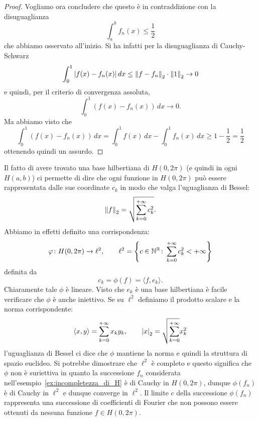 \begin{proof}
Vogliamo ora concludere che questo è in contraddizione con la disuguaglianza
\[
  \int_a^b f_n(x) \le \frac 1 2
\]
che abbiamo osservato all'inizio.
Si ha infatti per la disuguaglianza di Cauchy-Schwarz
\begin{align*}
  \int_0^1 {\left|f(x)-f_n(x)\right|}\, dx
  \le {\left\Vert f-f_n\right\Vert}_2\cdot {\left\Vert 1\right\Vert}_2  \to 0
\end{align*}
e quindi, per il criterio di convergenza assoluta,
\[
  \int_0^1 (f(x) - f_n(x))\, dx \to 0.
\]
Ma abbiamo visto che
\[
  \int_0^1 (f(x) - f_n(x))\, dx
  = \int_0^1 f(x)\, dx - \int_0^1 f_n(x)\, dx
  \ge 1 - \frac 1 2 = \frac 1 2
\]
ottenendo quindi un assurdo.
\end{proof}

Il fatto di avere trovato una base hilbertiana di $H(0,2\pi)$ (e quindi
in ogni $H(a,b)$) ci permette di
dire che ogni funzione in $H(0,2\pi)$ può essere rappresentata dalle sue
coordinate $c_k$ in modo che valga l'uguaglianza di Bessel:
\[
  {\left\Vert f\right\Vert}_2 = \sqrt{\sum_{k=0}^{+\infty} c_k^2}.
\]
Abbiamo in effetti definito una corrispondenza:
\[
  \varphi \colon H(0,2\pi) \to \ell^2,
  \qquad
  \ell^2={\left\{ c\in \mathbb N^\mathbb R \colon \sum_{k=0}^{+\infty} c_k^2<+\infty \right\}}
\]
definita da
\[
  c_k = \phi(f) = \langle f, e_k\rangle.
\]
Chiaramente tale $\phi$ è lineare. Visto che $e_k$ è una base hilbertiana
è facile verificare che $\phi$ è anche iniettivo. Se su $\ell^2$
definiamo il prodotto scalare e la norma corrispondente:
\[
  \langle x,y\rangle = \sum_{k=0}^{+\infty} x_k y_k, \qquad
  {\left|x\right|}_2 = \sqrt{\sum_{k=0}^{+\infty}} x_k^2
\]
l'uguaglianza di Bessel ci dice che $\phi$ mantiene la norma e quindi
la struttura di spazio euclideo. Si potrebbe dimostrare che $\ell^2$
è completo e questo significa che $\phi$ non è suriettiva in quanto
la successione $f_n$
considerata nell'esempio~\ref{ex:incompletezza_di_H}
è di Cauchy in $H(0,2\pi)$, dunque $\phi(f_n)$ è di Cauchy in $\ell^2$
e dunque converge in $\ell^2$. Il limite $c$ della successione $\phi(f_n)$
rappresenta una successione di coefficienti di Fourier che non possono
essere ottenuti da nessuna funzione $f\in H(0,2\pi)$.

